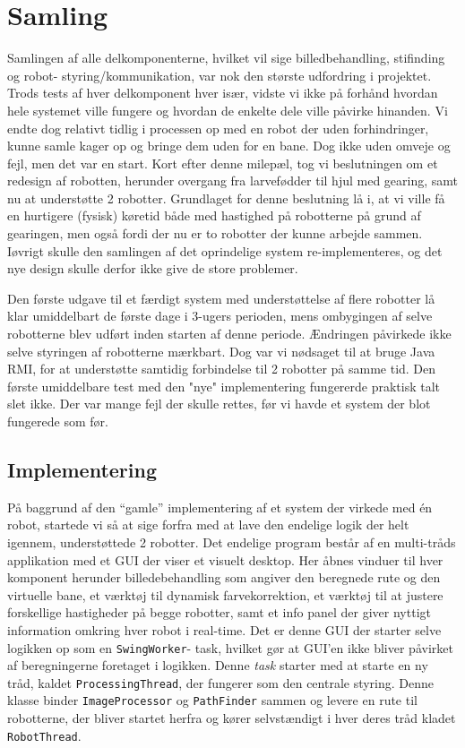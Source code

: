 \chapter{Samling}
Samlingen af alle delkomponenterne, hvilket vil sige billedbehandling, stifinding og robot- styring/kommunikation, var nok den største udfordring i projektet. Trods tests af hver delkomponent hver især, vidste vi ikke på forhånd hvordan hele systemet ville fungere og hvordan de enkelte dele ville påvirke hinanden. Vi endte dog relativt tidlig i processen op med en robot der uden forhindringer, kunne samle kager op og bringe dem uden for en bane. Dog ikke uden omveje og fejl, men det var en start.
Kort efter denne milepæl, tog vi beslutningen om et redesign af robotten, herunder overgang fra larvefødder til hjul med gearing, samt nu at understøtte 2 robotter. Grundlaget for denne beslutning lå i, at vi ville få en hurtigere (fysisk) køretid både med hastighed på robotterne på grund af gearingen, men også fordi der nu er to robotter der kunne arbejde sammen. Iøvrigt skulle den samlingen af det oprindelige system re-implementeres, og det nye design skulle derfor ikke give de store problemer.

Den første udgave til et færdigt system med understøttelse af flere robotter lå klar umiddelbart de første dage i 3-ugers perioden, mens ombygingen af selve robotterne blev udført inden starten af denne periode. Ændringen påvirkede ikke selve styringen af robotterne mærkbart. Dog var vi nødsaget til at bruge Java RMI, for at understøtte samtidig forbindelse til 2 robotter på samme tid.
Den første umiddelbare test med den "nye" implementering fungererde praktisk talt slet ikke. Der var mange fejl der skulle rettes, før vi havde et system der blot fungerede som før.

\section{Implementering}
På baggrund af den "`gamle"' implementering af et system der virkede med én robot, startede vi så at sige forfra med at lave den endelige logik der helt igennem, understøttede 2 robotter.
Det endelige program består af en multi-tråds applikation med et GUI der viser et visuelt desktop. Her åbnes vinduer til hver komponent herunder billedebehandling som angiver den beregnede rute og den virtuelle bane, et værktøj til dynamisk farvekorrektion, et værktøj til at justere forskellige hastigheder på begge robotter, samt et info panel der giver nyttigt information omkring hver robot i real-time.
Det er denne GUI der starter selve logikken op som en \texttt{SwingWorker}- task, hvilket gør at GUI’en ikke bliver påvirket af beregningerne foretaget i logikken. Denne \textit{task} starter med at starte en ny tråd, kaldet \texttt{ProcessingThread}, der fungerer som den centrale styring. Denne klasse binder \texttt{ImageProcessor} og \texttt{PathFinder} sammen og levere en rute til robotterne, der bliver startet herfra og kører selvstændigt i hver deres tråd kladet \texttt{RobotThread}.

